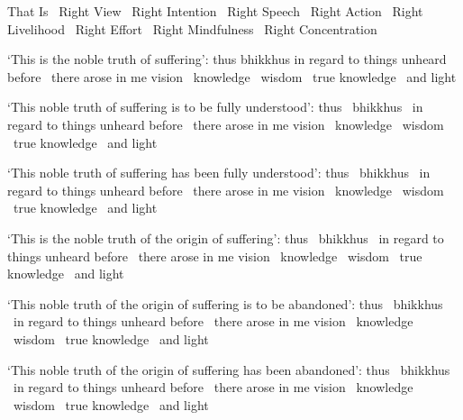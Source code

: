 \begin{english-only-hang}
  That Is \breathmark\ Right View \breathmark\ Right Intention \breathmark\ Right Speech \breathmark\ Right Action \breathmark\ Right Livelihood \breathmark\ Right Effort \breathmark\ Right Mindfulness \breathmark\ Right Concentration
\end{english-only-hang}

\begin{english-only-hang}
  `This is the noble truth of suffering': thus bhikkhus in regard to things unheard before \breathmark\ there arose in me vision \breathmark\ knowledge \breathmark\ wisdom \breathmark\ true knowledge \breathmark\ and light
\end{english-only-hang}

\begin{english-only-hang}
  `This noble truth of suffering is to be fully understood': thus \breathmark\ bhikkhus \breathmark\ in regard to things unheard before \breathmark\ there arose in me vision \breathmark\ knowledge \breathmark\ wisdom \breathmark\ true knowledge \breathmark\ and light
\end{english-only-hang}

\begin{english-only-hang}
  `This noble truth of suffering has been fully understood': thus \breathmark\ bhikkhus \breathmark\ in regard to things unheard before \breathmark\ there arose in me vision \breathmark\ knowledge \breathmark\ wisdom \breathmark\ true knowledge \breathmark\ and light
\end{english-only-hang}

\begin{english-only-hang}
  `This is the noble truth of the origin of suffering': thus \breathmark\ bhikkhus \breathmark\ in regard to things unheard before \breathmark\ there arose in me vision \breathmark\ knowledge \breathmark\ wisdom \breathmark\ true knowledge \breathmark\ and light
\end{english-only-hang}

\begin{english-only-hang}
  `This noble truth of the origin of suffering is to be abandoned': thus \breathmark\ bhikkhus \breathmark\ in regard to things unheard before \breathmark\ there arose in me vision \breathmark\ knowledge \breathmark\ wisdom \breathmark\ true knowledge \breathmark\ and light
\end{english-only-hang}

\begin{english-only-hang}
  `This noble truth of the origin of suffering has been abandoned': thus \breathmark\ bhikkhus \breathmark\ in regard to things unheard before \breathmark\ there arose in me vision \breathmark\ knowledge \breathmark\ wisdom \breathmark\ true knowledge \breathmark\ and light
\end{english-only-hang}

